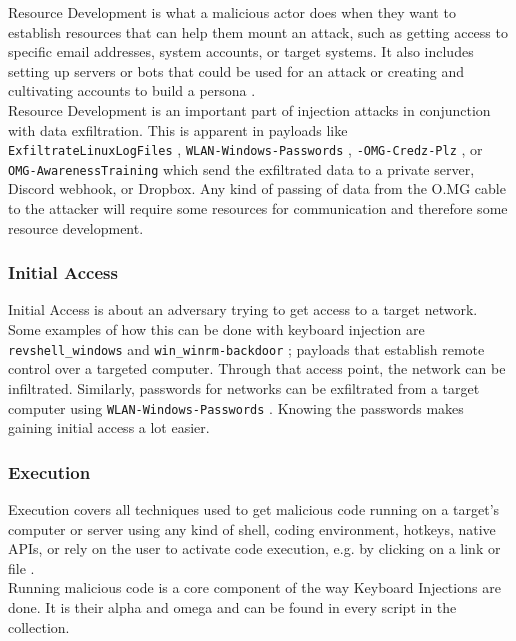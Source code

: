 Resource Development is what a malicious actor does when they want to establish resources that can help them mount an attack, such as getting access to specific email addresses,
system accounts, or target systems. It also includes setting up servers or bots that could be used for an attack or creating and cultivating accounts to build a persona \cite{MITREATTCK}.\\
Resource Development is an important part of injection attacks in conjunction with data exfiltration. This is apparent in payloads like
\verb|ExfiltrateLinuxLogFiles| \cite{OmgpayloadsPayloadsLibrary}, \verb|WLAN-Windows-Passwords| \cite{OmgpayloadsPayloadsLibrary}, \verb|-OMG-Credz-Plz|
\cite{OmgpayloadsPayloadsLibrary}, or \verb|OMG-AwarenessTraining| \cite{OmgpayloadsPayloadsLibrary} which send the exfiltrated data to a private server, Discord webhook, or Dropbox.
Any kind of passing of data from the O.MG cable to the attacker will require some resources for communication and therefore some resource development.


\subsubsection{Initial Access}

Initial Access is about an adversary trying to get access to a target network\cite{MITREATTCK}. Some examples of how this can be done with keyboard injection are
\verb|revshell_windows| and \verb|win_winrm-backdoor| \cite{OmgpayloadsPayloadsLibrary}; payloads that establish remote control over a targeted computer.
Through that access point, the network can be infiltrated. Similarly, passwords for networks can be exfiltrated from a target computer using \verb|WLAN-Windows-Passwords|
\cite{OmgpayloadsPayloadsLibrary}. Knowing the passwords makes gaining initial access a lot easier. \\

\subsubsection{Execution}

Execution covers all techniques used to get malicious code running on a target's computer or server using any kind of shell, coding environment, hotkeys, native APIs, or
rely on the user to activate code execution, e.g. by clicking on a link or file \cite{MITREATTCK}.\\
Running malicious code is a core component of the way Keyboard Injections are done. It is their alpha and omega and can be found in every script in the collection.

